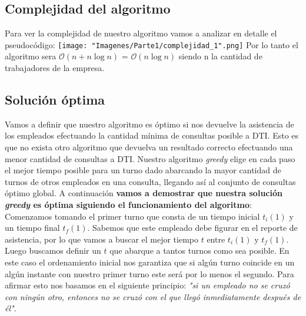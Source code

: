 \subsection{Complejidad del algoritmo}
Para ver la complejidad de nuestro algoritmo vamos a analizar en detalle el pseudocódigo: \newline
\newline
\texttt{[image: "Imagenes/Parte1/complejidad\_1".png]}\newline
\newline
Por lo tanto el algoritmo sera $\mathcal{O}(n+n\log{n})$ = $\mathcal{O}(n\log{n})$ siendo n la cantidad de trabajadores de la empresa.\newline \newpage

\subsection{Solución óptima}
Vamos a definir que nuestro algoritmo es óptimo si nos devuelve la asistencia de los empleados efectuando la cantidad mínima de consultas posible a DTI. Esto es que no exista otro algoritmo que devuelva un resultado correcto efectuando una menor cantidad de consultas a DTI.\newline
\newline
Nuestro algoritmo \emph{greedy} elige en cada paso el mejor tiempo posible para un turno dado abarcando la mayor cantidad de turnos de otros empleados en una consulta, llegando así al conjunto de consultas óptimo global.\newline
\newline
A continuación \textbf{vamos a demostrar que nuestra solución \emph{greedy} es óptima siguiendo el funcionamiento del algoritmo}:\newline
\newline
Comenzamos tomando el primer turno que consta de un tiempo inicial $t_{i}(1)$ y un tiempo final $t_{f}(1)$. Sabemos que este empleado debe figurar en el reporte de asistencia, por lo que vamos a buscar el mejor tiempo $t$ entre $t_{i}(1)$ y $t_{f}(1)$.\newline
\newline
Luego buscamos definir un $t$ que abarque a tantos turnos como sea posible. En este caso el ordenamiento inicial nos garantiza que si algún turno coincide en un algún instante con nuestro primer turno este será por lo menos el segundo. Para afirmar esto nos basamos en el siguiente principio: \emph{"si un empleado no se cruzó con ningún otro, entonces no se cruzó con el que llegó inmediatamente después de él"}.
